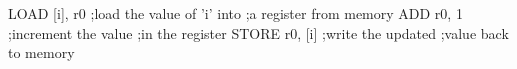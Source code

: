 \documentclass[varwidth=23em,crop]{standalone}
\begin{document}
\begin{nasmcode}
LOAD    [i], r0   ;load the value of 'i' into
                  ;a register from memory
ADD     r0, 1     ;increment the value
                  ;in the register
STORE   r0, [i]   ;write the updated
                  ;value back to memory          
\end{nasmcode}
\end{document}
